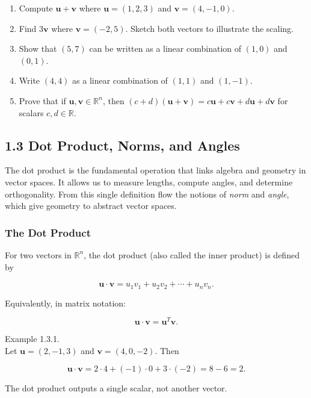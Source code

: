 \documentclass[
  12pt,
  a4paper,
]{article}
\begin{document}
\begin{enumerate}
\def\labelenumi{\arabic{enumi}.}
\item
  Compute \(\mathbf{u} + \mathbf{v}\) where \(\mathbf{u} = (1,2,3)\) and
  \(\mathbf{v} = (4, -1, 0)\).
\item
  Find \(3\mathbf{v}\) where \(\mathbf{v} = (-2,5)\). Sketch both
  vectors to illustrate the scaling.
\item
  Show that \((5,7)\) can be written as a linear combination of
  \((1,0)\) and \((0,1)\).
\item
  Write \((4,4)\) as a linear combination of \((1,1)\) and \((1,-1)\).
\item
  Prove that if \(\mathbf{u}, \mathbf{v} \in \mathbb{R}^n\), then
  \((c+d)(\mathbf{u}+\mathbf{v}) = c\mathbf{u} + c\mathbf{v} + d\mathbf{u} + d\mathbf{v}\)
  for scalars \(c,d \in \mathbb{R}\).
\end{enumerate}

\subsection{1.3 Dot Product, Norms, and
Angles}\label{13-dot-product-norms-and-angles}

The dot product is the fundamental operation that links algebra and
geometry in vector spaces. It allows us to measure lengths, compute
angles, and determine orthogonality. From this single definition flow
the notions of \emph{norm} and \emph{angle}, which give geometry to
abstract vector spaces.

\subsubsection{The Dot Product}\label{the-dot-product}

For two vectors in \(\mathbb{R}^n\), the dot product (also called the
inner product) is defined by

\[\mathbf{u} \cdot \mathbf{v} = u_1 v_1 + u_2 v_2 + \cdots + u_n v_n.\]

Equivalently, in matrix notation:

\[\mathbf{u} \cdot \mathbf{v} = \mathbf{u}^T \mathbf{v}.\]

Example 1.3.1.\\
Let \(\mathbf{u} = (2, -1, 3)\) and \(\mathbf{v} = (4, 0, -2)\). Then

\[\mathbf{u} \cdot \mathbf{v} = 2\cdot 4 + (-1)\cdot 0 + 3\cdot (-2) = 8 - 6 = 2.\]

The dot product outputs a single scalar, not another vector.
\end{document}
